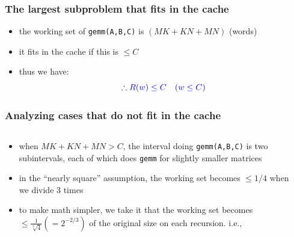 \documentclass[12pt,dvipdfmx]{beamer}
\newcommand{\ao}[1]{{\color{blue}#1}}
\begin{document}
\begin{frame}
\frametitle{The largest subproblem that fits in the cache}
\begin{itemize}
\item the working set of {\tt gemm(A,B,C)} is $(MK+KN+MN)$ (words)
\item it fits in the cache if this is $\leq C$
\item thus we have:
  \[ \therefore \ao{R(w) \leq C \quad (w \leq C)} \]
\end{itemize}
\end{frame}

\begin{frame}
\frametitle{Analyzing cases that do not fit in the cache}

\begin{columns}[t]
\begin{column}{0.6\textwidth}
\begin{itemize}
\item<1-> when $MK+KN+MN > C$, the interval doing
  {\tt gemm(A,B,C)} is two subintervals, 
  each of which does \texttt{gemm} for slightly smaller matrices

\item<2-> in the ``nearly square'' assumption, 
  the working set becomes $\leq 1/4$ when we divide 3
  times

\item<3-> to make math simpler, we take it that
  the working set becomes 
  ${\displaystyle \leq \frac{1}{\sqrt[3]{4}}} (= 2^{-2/3})$ of the
  original size on each recursion. i.e.,
\end{itemize}
\end{column}

\begin{column}{0.4\textwidth}
\begin{center}
\def\svgwidth{0.8\textwidth}
{\tiny }
\end{center}
\end{column}
\end{columns}

\only<4->{
\[ \therefore \ao{R(w) \leq 2 R(w / \sqrt[3]{4}) \quad (w > C)} \]
}
\end{frame}
\end{document}
